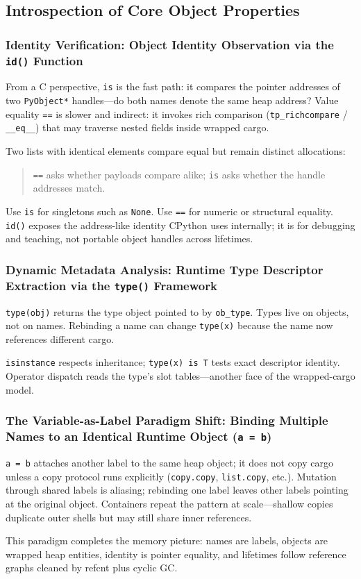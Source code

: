 \subsection{Introspection of Core Object Properties}


\subsubsection{Identity Verification: Object Identity Observation via the \texttt{id()} Function}

From a C perspective, \texttt{is} is the fast path: it compares the pointer addresses of two \texttt{PyObject*} handles---do both names denote the same heap address? Value equality \texttt{==} is slower and indirect: it invokes rich comparison (\texttt{tp\_richcompare} / \texttt{\_\_eq\_\_}) that may traverse nested fields inside wrapped cargo.

Two lists with identical elements compare equal but remain distinct allocations:

\begin{quote}
\texttt{==} asks whether payloads compare alike; \texttt{is} asks whether the handle addresses match.
\end{quote}

Use \texttt{is} for singletons such as \texttt{None}. Use \texttt{==} for numeric or structural equality. \texttt{id()} exposes the address-like identity CPython uses internally; it is for debugging and teaching, not portable object handles across lifetimes.

\subsubsection{Dynamic Metadata Analysis: Runtime Type Descriptor Extraction via the \texttt{type()} Framework}

\texttt{type(obj)} returns the type object pointed to by \texttt{ob\_type}. Types live on objects, not on names. Rebinding a name can change \texttt{type(x)} because the name now references different cargo.

\texttt{isinstance} respects inheritance; \texttt{type(x) is T} tests exact descriptor identity. Operator dispatch reads the type's slot tables---another face of the wrapped-cargo model.

\subsubsection{The Variable-as-Label Paradigm Shift: Binding Multiple Names to an Identical Runtime Object (\texttt{a = b})}

\texttt{a = b} attaches another label to the same heap object; it does not copy cargo unless a copy protocol runs explicitly (\texttt{copy.copy}, \texttt{list.copy}, etc.). Mutation through shared labels is aliasing; rebinding one label leaves other labels pointing at the original object. Containers repeat the pattern at scale---shallow copies duplicate outer shells but may still share inner references.

This paradigm completes the memory picture: names are labels, objects are wrapped heap entities, identity is pointer equality, and lifetimes follow reference graphs cleaned by refcnt plus cyclic GC.

